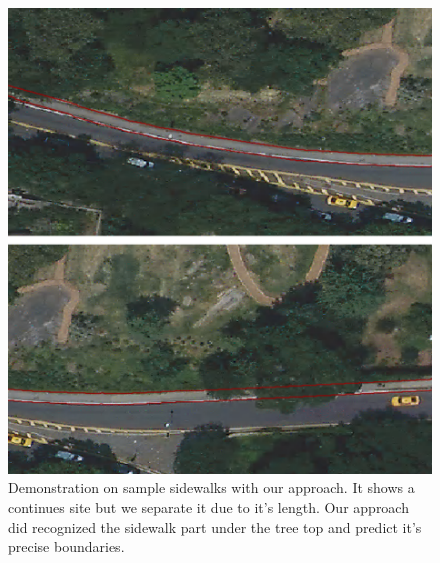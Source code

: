 \begin{figure}
    \centering
    \includegraphics[width=\textwidth]{Figures/ny3.png}
    \caption[Sample Sidewalk 6]{Demonstration on sample sidewalks with our approach. It shows a continues site but we separate it due to it's length. Our approach did recognized the sidewalk part under the tree top and predict it's precise boundaries.}
    \label{fig:ny3}
\end{figure}

